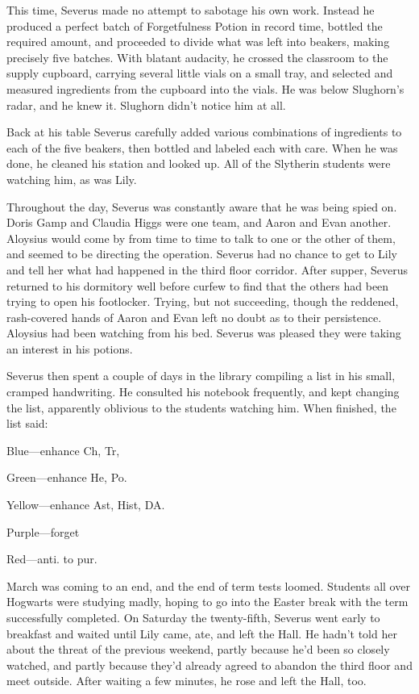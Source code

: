 This time, Severus made no attempt to sabotage his own work. Instead he produced a perfect batch of Forgetfulness Potion in record time, bottled the required amount, and proceeded to divide what was left into beakers, making precisely five batches. With blatant audacity, he crossed the classroom to the supply cupboard, carrying several little vials on a small tray, and selected and measured ingredients from the cupboard into the vials. He was below Slughorn's radar, and he knew it. Slughorn didn't notice him at all.

Back at his table Severus carefully added various combinations of ingredients to each of the five beakers, then bottled and labeled each with care. When he was done, he cleaned his station and looked up. All of the Slytherin students were watching him, as was Lily.

Throughout the day, Severus was constantly aware that he was being spied on. Doris Gamp and Claudia Higgs were one team, and Aaron and Evan another. Aloysius would come by from time to time to talk to one or the other of them, and seemed to be directing the operation. Severus had no chance to get to Lily and tell her what had happened in the third floor corridor. After supper, Severus returned to his dormitory well before curfew to find that the others had been trying to open his footlocker. Trying, but not succeeding, though the reddened, rash-covered hands of Aaron and Evan left no doubt as to their persistence. Aloysius had been watching from his bed. Severus was pleased they were taking an interest in his potions.

Severus then spent a couple of days in the library compiling a list in his small, cramped handwriting. He consulted his notebook frequently, and kept changing the list, apparently oblivious to the students watching him. When finished, the list said:

\begin{writtenNote}

Blue—enhance Ch, Tr,

Green—enhance He, Po.

Yellow—enhance Ast, Hist, DA.

Purple—forget

Red—anti. to pur.

\end{writtenNote}

March was coming to an end, and the end of term tests loomed. Students all over Hogwarts were studying madly, hoping to go into the Easter break with the term successfully completed. On Saturday the twenty-fifth, Severus went early to breakfast and waited until Lily came, ate, and left the Hall. He hadn't told her about the threat of the previous weekend, partly because he'd been so closely watched, and partly because they'd already agreed to abandon the third floor and meet outside. After waiting a few minutes, he rose and left the Hall, too.


